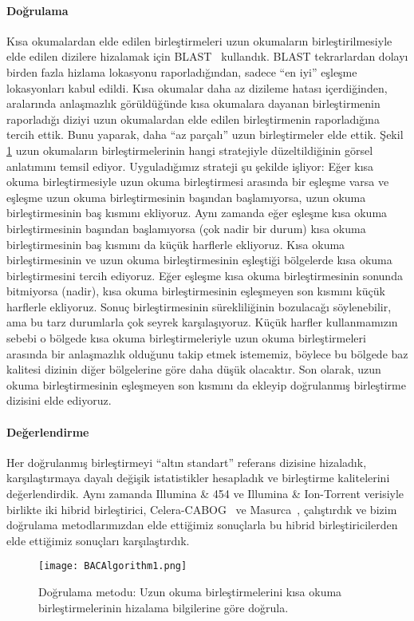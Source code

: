 \paragraph{Doğrulama} 
Kısa okumalardan elde edilen birleştirmeleri uzun okumaların birleştirilmesiyle elde edilen dizilere hizalamak için BLAST~\cite{Altschul1990} kullandık.
BLAST tekrarlardan dolayı birden fazla hizlama lokasyonu raporladığından, sadece ``en iyi'' eşleşme lokasyonları kabul edildi.
Kısa okumalar daha az dizileme hatası içerdiğinden, aralarında anlaşmazlık görüldüğünde kısa okumalara dayanan birleştirmenin raporladığı diziyi uzun okumalardan elde edilen birleştirmenin raporladığına tercih ettik.
Bunu yaparak, daha ``az parçalı'' uzun birleştirmeler elde ettik. Şekil \ref{correction} uzun okumaların birleştirmelerinin hangi stratejiyle düzeltildiğinin görsel anlatımını temsil ediyor. 
Uyguladığımız strateji şu şekilde işliyor: Eğer kısa okuma birleştirmesiyle uzun okuma birleştirmesi arasında bir eşleşme varsa ve eşleşme uzun okuma birleştirmesinin başından başlamıyorsa, uzun okuma birleştirmesinin baş kısmını ekliyoruz.
Aynı zamanda eğer eşleşme kısa okuma birleştirmesinin başından başlamıyorsa (çok nadir bir durum) kısa okuma birleştirmesinin baş kısmını da küçük harflerle ekliyoruz. 
Kısa okuma birleştirmesinin ve uzun okuma birleştirmesinin eşleştiği bölgelerde kısa okuma birleştirmesini tercih ediyoruz. 
Eğer eşleşme kısa okuma birleştirmesinin sonunda bitmiyorsa (nadir), kısa okuma birleştirmesinin eşleşmeyen son kısmını küçük harflerle ekliyoruz.
Sonuç birleştirmesinin sürekliliğinin bozulacağı söylenebilir, ama bu tarz durumlarla çok seyrek karşılaşıyoruz.
Küçük harfler kullanmamızın sebebi o bölgede kısa okuma birleştirmeleriyle uzun okuma birleştirmeleri arasında bir anlaşmazlık olduğunu takip etmek istememiz, böylece bu bölgede baz kalitesi dizinin diğer bölgelerine göre daha düşük olacaktır.
Son olarak, uzun okuma birleştirmesinin eşleşmeyen son kısmını da ekleyip doğrulanmış birleştirme dizisini elde ediyoruz.  

\paragraph{Değerlendirme}
Her doğrulanmış birleştirmeyi ``altın standart'' referans dizisine  hizaladık, karşılaştırmaya dayalı değişik istatistikler hesapladık ve birleştirme kalitelerini değerlendirdik.
Aynı zamanda Illumina \& 454 ve Illumina \& Ion-Torrent verisiyle birlikte iki hibrid birleştirici, Celera-CABOG~\cite{Miller2008} ve Masurca~\cite{Zimin2013}, çalıştırdık ve bizim doğrulama metodlarımızdan elde ettiğimiz sonuçlarla bu hibrid birleştiricilerden elde ettiğimiz sonuçları karşılaştırdık.

\begin{figure}[htb]
\begin{center}
  \texttt{[image: BACAlgorithm1.png]}
\end{center}
  \caption{Doğrulama metodu: Uzun okuma birleştirmelerini kısa okuma birleştirmelerinin hizalama bilgilerine göre doğrula.}
  \label{correction}
\end{figure}







